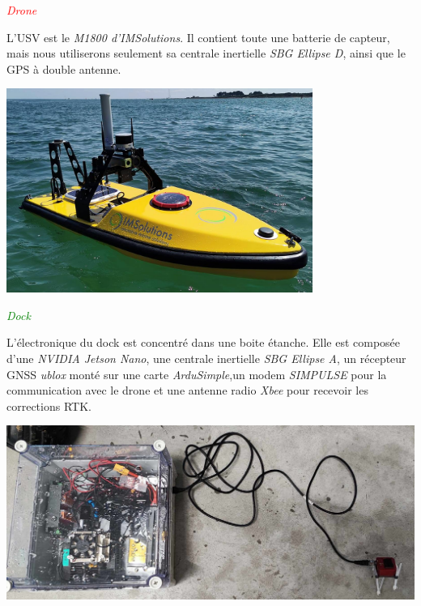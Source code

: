 \documentclass[portrait,final,a0paper,fontscale=0.3]{baposter}
\begin{document}
\begin{poster}
{	\begin{minipage}[t]{0.30\textwidth}
		\vspace{-0.1cm}
		\begin{center}
			\large\textcolor{red}{\emph{Drone}}
		\end{center}
		\small\vspace{-0.2cm}
		L'USV est le \textit{M1800 d'IMSolutions}. Il contient toute une batterie de capteur,
		mais nous utiliserons seulement sa centrale inertielle \textit{SBG Ellipse D}, ainsi
		que le GPS à double antenne.
		\begin{center}
			\includegraphics*[width=0.75\textwidth]{imgs/monodrone-1800-chenal.jpg}
		\end{center}
	\end{minipage}\hfill
	\begin{minipage}[t]{0.30\textwidth}
		\vspace{-0.1cm}
		\begin{center}
			\large\textcolor{green}{\emph{Dock}}
		\end{center}
		\small\vspace{-0.2cm}
		L'électronique du dock est concentré dans une boite étanche. Elle est composée d'une \textit{NVIDIA
		Jetson Nano}, une centrale inertielle \textit{SBG Ellipse A}, un récepteur GNSS \textit{ublox} monté
		sur une carte \textit{ArduSimple},un modem \textit{SIMPULSE} pour la communication avec le drone
		et une antenne radio \textit{Xbee} pour recevoir les corrections RTK.
		\begin{center}
			\includegraphics*[height=0.8\textwidth,angle=90]{imgs/dock_box_outside.jpg}

\end{center}
\end{minipage}}
\end{poster}
\end{document}
